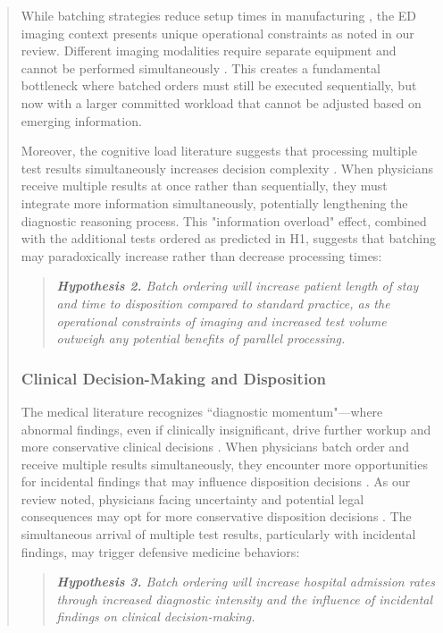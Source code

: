 \documentclass[11pt]{article}
\newcommand{\1}{\hbox{\rm 1\kern-.35em 1}}
\begin{document}
{\begin{quote}
While batching strategies reduce setup times in manufacturing \cite{Fowler2022}, the ED imaging context presents unique operational constraints as noted in our review. Different imaging modalities require separate equipment and cannot be performed simultaneously \cite{Jessome2020}. This creates a fundamental bottleneck where batched orders must still be executed sequentially, but now with a larger committed workload that cannot be adjusted based on emerging information.

Moreover, the cognitive load literature suggests that processing multiple test results simultaneously increases decision complexity \cite{kc2013does}. When physicians receive multiple results at once rather than sequentially, they must integrate more information simultaneously, potentially lengthening the diagnostic reasoning process. This "information overload" effect, combined with the additional tests ordered as predicted in H1, suggests that batching may paradoxically increase rather than decrease processing times:

\begin{quote}
\small
\textit{\textbf{Hypothesis 2.} Batch ordering will increase patient length of stay and time to disposition compared to standard practice, as the operational constraints of imaging and increased test volume outweigh any potential benefits of parallel processing.}
\end{quote}

\subsubsection*{Clinical Decision-Making and Disposition}

The medical literature recognizes ``diagnostic momentum"---where abnormal findings, even if clinically insignificant, drive further workup and more conservative clinical decisions \cite{coen2022clinical; featherston2020decision}. When physicians batch order and receive multiple results simultaneously, they encounter more opportunities for incidental findings that may influence disposition decisions \cite{lumbreras2010incidental, berlin2011incidentaloma}. As our review noted, physicians facing uncertainty and potential legal consequences may opt for more conservative disposition decisions \cite{rao2012overuse, lam2020why}. The simultaneous arrival of multiple test results, particularly with incidental findings, may trigger defensive medicine behaviors:

\begin{quote}
\small
\textit{\textbf{Hypothesis 3.} Batch ordering will increase hospital admission rates through increased diagnostic intensity and the influence of incidental findings on clinical decision-making.}
\end{quote}


\end{quote}}
\end{document}
